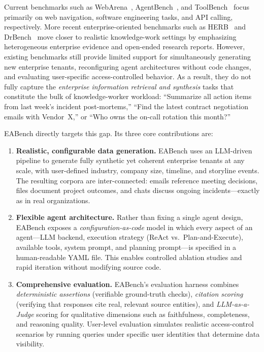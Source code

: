 \documentclass[10pt,twocolumn]{article}
\begin{document}
Current benchmarks such as WebArena~\citep{zhou2023webarena},
AgentBench~\citep{liu2023agentbench}, and ToolBench~\citep{qin2023toolllm}
focus primarily on web navigation, software engineering tasks, and API calling,
respectively.  More recent enterprise-oriented benchmarks such as
HERB~\citep{choubey2025herb} and DrBench~\citep{abaskohi2025drbench} move
closer to realistic knowledge-work settings by emphasizing heterogeneous
enterprise evidence and open-ended research reports.  However, existing
benchmarks still provide limited support for simultaneously generating new
enterprise tenants, reconfiguring agent architectures without code changes, and
evaluating user-specific access-controlled behavior.  As a result, they do not
fully capture the \emph{enterprise information retrieval and synthesis} tasks
that constitute the bulk of knowledge-worker workload: ``Summarize all action
items from last week's incident post-mortems,'' ``Find the latest contract
negotiation emails with Vendor~X,'' or ``Who owns the on-call rotation this
month?''

EABench directly targets this gap.  Its three core contributions are:

\begin{enumerate}[leftmargin=*,itemsep=2pt]
  \item \textbf{Realistic, configurable data generation.}
    EABench uses an LLM-driven pipeline to generate fully synthetic yet
    coherent enterprise tenants at any scale, with user-defined industry,
    company size, timeline, and storyline events.  The resulting corpora are
    inter-connected: emails reference meeting decisions, files document project
    outcomes, and chats discuss ongoing incidents---exactly as in real
    organizations.

  \item \textbf{Flexible agent architecture.}
    Rather than fixing a single agent design, EABench exposes a
    \emph{configuration-as-code} model in which every aspect of an
    agent---LLM backend, execution strategy (ReAct vs.\ Plan-and-Execute),
    available tools, system prompt, and planning prompt---is specified in a
    human-readable YAML file.  This enables controlled ablation studies and
    rapid iteration without modifying source code.

  \item \textbf{Comprehensive evaluation.}
    EABench's evaluation harness combines \emph{deterministic assertions}
    (verifiable ground-truth checks), \emph{citation scoring} (verifying that
    responses cite real, relevant source entities), and
    \emph{LLM-as-a-Judge} scoring for qualitative dimensions such as
    faithfulness, completeness, and reasoning quality.  User-level evaluation
    simulates realistic access-control scenarios by running queries under
    specific user identities that determine data visibility.
\end{enumerate}
\end{document}
